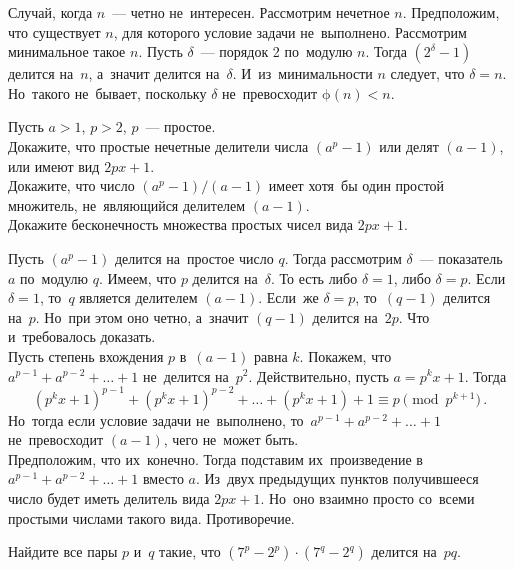 \ifincludesolutions
Случай, когда $n$~— четно не~интересен.
Рассмотрим нечетное $n$.
Предположим, что существует $n$, для которого условие задачи не~выполнено.
Рассмотрим минимальное такое $n$.
Пусть $\delta$~— порядок 2 по~модулю $n$.
Тогда $(2^{\delta} - 1)$ делится на~$n$, а~значит делится на~$\delta$.
И~из~минимальности $n$ следует, что $\delta = n$.
Но~такого не~бывает, поскольку $\delta$ не~превосходит $\mathrm{\phi}(n) < n$.
\fi %

\begin{problems}

\item
Пусть $a > 1$, $p > 2$, $p$~— простое.
\\
\subproblem
Докажите, что простые нечетные делители числа $(a^p - 1)$ или делят $(a - 1)$,
или имеют вид $2 p x + 1$.
\\
\subproblem
Докажите, что число $(a^p - 1) / (a - 1)$ имеет хотя~бы один простой
множитель, не~являющийся делителем $(a - 1)$.
\\
\subproblem
Докажите бесконечность множества простых чисел вида $2 p x + 1$.

\end{problems}

\ifincludesolutions
\setcounter{jeolmsubproblem}{0}%
\subproblem
Пусть $(a^p - 1)$ делится на~простое число $q$.
Тогда рассмотрим $\delta$~— показатель $a$ по~модулю $q$.
Имеем, что $p$ делится на~$\delta$.
То есть либо $\delta = 1$, либо $\delta = p$.
Если $\delta = 1$, то~$q$ является делителем $(a - 1)$.
Если~же $\delta = p$, то~$(q - 1)$ делится на~$p$.
Но~при этом оно четно, а~значит $(q - 1)$ делится на~$2 p$.
Что и~требовалось доказать.
\\
\subproblem
Пусть степень вхождения $p$ в~$(a - 1)$ равна $k$.
Покажем, что $a^{p-1} + a^{p-2} + \ldots + 1$ не~делится на~$p^2$.
Действительно, пусть $a = p^k x + 1$.
Тогда
\[
    (p^k x + 1)^{p-1} + (p^k x + 1)^{p-2} + \ldots + (p^k x + 1) + 1
\equiv
    p
\pmod{p^{k+1}}
\, . \]
Но~тогда если условие задачи не~выполнено, то~$a^{p-1} + a^{p-2} + \ldots + 1$
не~превосходит $(a - 1)$, чего не~может быть.
\\
\subproblem
Предположим, что их~конечно.
Тогда подставим их~произведение в~$a^{p-1} + a^{p-2} + \ldots + 1$ вместо $a$.
Из~двух предыдущих пунктов получившееся число будет иметь делитель
вида $2 p x + 1$.
Но~оно взаимно просто со~всеми простыми числами такого вида.
Противоречие.
\fi %

\begin{problems}


\item
Найдите все пары $p$ и~$q$ такие, что $(7^{p} - 2^{p}) \cdot (7^{q} - 2^{q})$
делится на~$p q$.

\end{problems}

